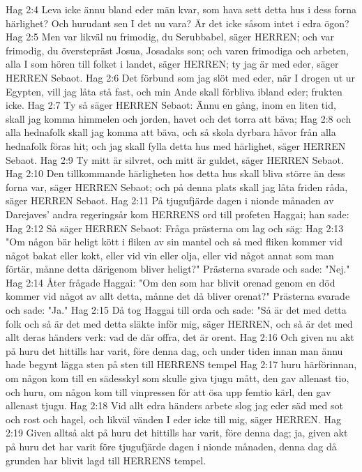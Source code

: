 Hag 2:4  Leva icke ännu bland eder män kvar, som hava sett detta hus i dess forna härlighet? Och hurudant sen I det nu vara? Är det icke såsom intet i edra ögon?
Hag 2:5  Men var likväl nu frimodig, du Serubbabel, säger HERREN; och var frimodig, du överstepräst Josua, Josadaks son; och varen frimodiga och arbeten, alla I som hören till folket i landet, säger HERREN; ty jag är med eder, säger HERREN Sebaot.
Hag 2:6  Det förbund som jag slöt med eder, när I drogen ut ur Egypten, vill jag låta stå fast, och min Ande skall förbliva ibland eder; frukten icke.
Hag 2:7  Ty så säger HERREN Sebaot: Ännu en gång, inom en liten tid, skall jag komma himmelen och jorden, havet och det torra att bäva;
Hag 2:8  och alla hednafolk skall jag komma att bäva, och så skola dyrbara håvor från alla hednafolk föras hit; och jag skall fylla detta hus med härlighet, säger HERREN Sebaot.
Hag 2:9  Ty mitt är silvret, och mitt är guldet, säger HERREN Sebaot.
Hag 2:10  Den tillkommande härligheten hos detta hus skall bliva större än dess forna var, säger HERREN Sebaot; och på denna plats skall jag låta friden råda, säger HERREN Sebaot.
Hag 2:11  På tjugufjärde dagen i nionde månaden av Darejaves' andra regeringsår kom HERRENS ord till profeten Haggai; han sade:
Hag 2:12  Så säger HERREN Sebaot: Fråga prästerna om lag och säg:
Hag 2:13  "Om någon bär heligt kött i fliken av sin mantel och så med fliken kommer vid något bakat eller kokt, eller vid vin eller olja, eller vid något annat som man förtär, månne detta därigenom bliver heligt?" Prästerna svarade och sade: "Nej."
Hag 2:14  Åter frågade Haggai: "Om den som har blivit orenad genom en död kommer vid något av allt detta, månne det då bliver orenat?" Prästerna svarade och sade: "Ja."
Hag 2:15  Då tog Haggai till orda och sade: "Så är det med detta folk och så är det med detta släkte inför mig, säger HERREN, och så är det med allt deras händers verk: vad de där offra, det är orent.
Hag 2:16  Och given nu akt på huru det hittills har varit, före denna dag, och under tiden innan man ännu hade begynt lägga sten på sten till HERRENS tempel
Hag 2:17  huru härförinnan, om någon kom till en sädesskyl som skulle giva tjugu mått, den gav allenast tio, och huru, om någon kom till vinpressen för att ösa upp femtio kärl, den gav allenast tjugu.
Hag 2:18  Vid allt edra händers arbete slog jag eder säd med sot och rost och hagel, och likväl vänden I eder icke till mig, säger HERREN.
Hag 2:19  Given alltså akt på huru det hittills har varit, före denna dag; ja, given akt på huru det har varit före tjugufjärde dagen i nionde månaden, denna dag då grunden har blivit lagd till HERRENS tempel.
